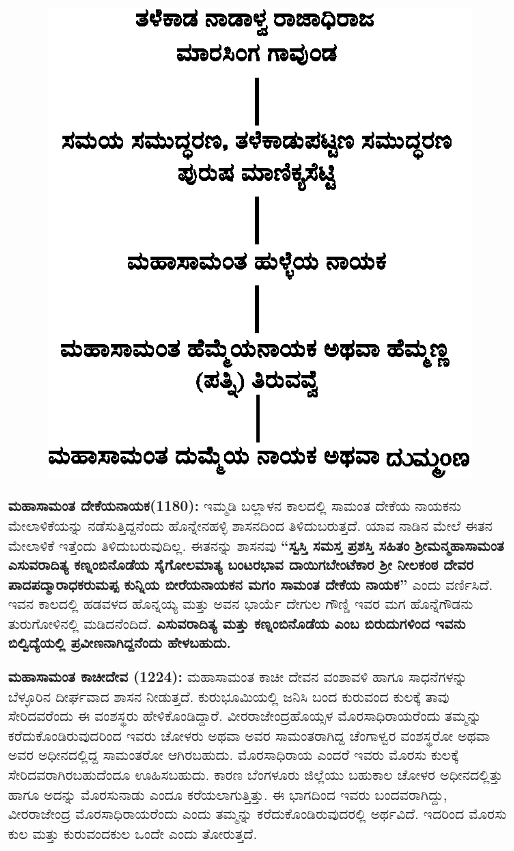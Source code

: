 \newpage

\begin{figure}[H]
\includegraphics[scale=1.2]{images/chap3/chap3fig6.jpeg}
\end{figure}

\textbf{ಮಹಾಸಾಮಂತ ದೇಕೆಯನಾಯಕ(1180):} ಇಮ್ಮಡಿ ಬಲ್ಲಾಳನ ಕಾಲದಲ್ಲಿ ಸಾಮಂತ ದೇಕೆಯ ನಾಯಕನು ಮೇಲಾಳಿಕೆ\-ಯನ್ನು ನಡೆಸುತ್ತಿದ್ದನೆಂದು ಹೊನ್ನೇನಹಳ್ಳಿ ಶಾಸನದಿಂದ ತಿಳಿದುಬರುತ್ತದೆ. ಯಾವ ನಾಡಿನ ಮೇಲೆ ಈತನ ಮೇಲಾಳಿಕೆ ಇತ್ತೆಂದು ತಿಳಿದುಬರುವುದಿಲ್ಲ. ಈತನನ್ನು ಶಾಸನವು \textbf{“ಸ್ವಸ್ತಿ ಸಮಸ್ತ ಪ್ರಶಸ್ತಿ ಸಹಿತಂ ಶ‍್ರೀಮನ್ಮಹಾಸಾಮಂತ ಎಸುವರಾದಿತ್ಯ ಕಣ್ನಂಬಿನೊಡೆಯ ಸೈಗೋಲಮಾತ್ಯ ಬಂಟರಭಾವ ದಾಯಿಗಬೇಂಟೆಕಾರ ಶ‍್ರೀ ನೀಲಕಂಠ ದೇವರ\general{\break } ಪಾದಪದ್ಮಾರಾಧಕರುಮಪ್ಪ ಕುನ್ನಿಯ ಬೀರೆಯನಾಯಕನ ಮಗಂ ಸಾಮಂತ ದೇಕೆಯ ನಾಯಕ”} ಎಂದು ವರ್ಣಿಸಿದೆ. ಇವನ ಕಾಲದಲ್ಲಿ ಹಡವಳದ ಹೊನ್ನಯ್ಯ ಮತ್ತು ಅವನ ಭಾರ್ಯೆ ದೇಗುಲ ಗೌಣ್ಡಿ ಇವರ ಮಗ ಹೊನ್ನೆಗೌಡನು ತುರುಗೋಳಿನಲ್ಲಿ ಮಡಿದನೆಂದಿದೆ. \textbf{ಎಸುವರಾದಿತ್ಯ ಮತ್ತು ಕಣ್ನಂಬಿನೊಡೆಯ ಎಂಬ ಬಿರುದುಗಳಿಂದ ಇವನು ಬಿಲ್ವಿದ್ಯೆಯಲ್ಲಿ ಪ್ರವೀಣ\-ನಾಗಿದ್ದನೆಂದು ಹೇಳಬಹುದು.}

\textbf{ಮಹಾಸಾಮಂತ ಕಾಚೀದೇವ (1224):} ಮಹಾಸಾಮಂತ ಕಾಚೀ ದೇವನ ವಂಶಾವಳಿ ಹಾಗೂ ಸಾಧನೆಗಳನ್ನು ಬೆಳ್ಳೂರಿನ ದೀರ್ಘವಾದ ಶಾಸನ ನೀಡುತ್ತದೆ. ಕುರುಭೂಮಿಯಲ್ಲಿ ಜನಿಸಿ ಬಂದ ಕುರುವಂದ ಕುಲಕ್ಕೆ ತಾವು ಸೇರಿದವರೆಂದು ಈ ವಂಶಸ್ಥರು ಹೇಳಿಕೊಂಡಿದ್ದಾರೆ. ವೀರರಾಜೇಂದ್ರಹೊಯ್ಸಳ ಮೊರಸಾಧಿರಾಯರೆಂದು ತಮ್ಮನ್ನು ಕರೆದುಕೊಂಡಿರುವುದರಿಂದ ಇವರು ಚೋಳರು ಅಥವಾ ಅವರ ಸಾಮಂತರಾಗಿದ್ದ ಚೆಂಗಾಳ್ವರ ವಂಶಸ್ಥರೋ ಅಥವಾ ಅವರ ಅಧೀನದಲ್ಲಿದ್ದ ಸಾಮಂತರೋ ಆಗಿರಬಹುದು. ಮೊರಸಾಧಿರಾಯ ಎಂದರೆ ಇವರು ಮೊರಸು ಕುಲಕ್ಕೆ ಸೇರಿದವರಾಗಿರಬಹುದೆಂದೂ ಊಹಿಸಬಹುದು. ಕಾರಣ ಬೆಂಗಳೂರು ಜಿಲ್ಲೆಯು ಬಹುಕಾಲ ಚೋಳರ ಅಧೀನದಲ್ಲಿತ್ತು ಹಾಗೂ ಅದನ್ನು ಮೊರಸುನಾಡು ಎಂದೂ ಕರೆಯಲಾಗು\-ತ್ತಿತ್ತು. ಈ ಭಾಗದಿಂದ ಇವರು ಬಂದವರಾಗಿದ್ದು, ವೀರರಾಜೇಂದ್ರ ಮೊರಸಾಧಿರಾಯರೆಂದು ಎಂದು ತಮ್ಮನ್ನು ಕರೆದುಕೊಂಡಿರು\-ವುದರಲ್ಲಿ ಅರ್ಥವಿದೆ. ಇದರಿಂದ ಮೊರಸು ಕುಲ ಮತ್ತು ಕುರುವಂದಕುಲ ಒಂದೇ ಎಂದು ತೋರುತ್ತದೆ.

